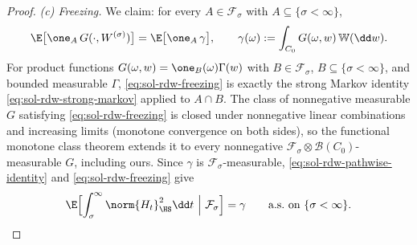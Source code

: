 \documentclass[../main.tex]{subfiles}
\begin{document}
\begin{proof}
\emph{(c) Freezing.}  We claim: for every $A\in\mathcal F_\sigma$ with
$A\subseteq\{\sigma<\infty\}$,
\begin{equation}
  \E\bigl[\one_A\,G(\cdot,W^{(\sigma)})\bigr]
  =\E\bigl[\one_A\,\gamma\bigr],
  \qquad
  \gamma(\omega):=\int_{C_0}G(\omega,w)\,\mathbb W(\dd w).
  \label{eq:sol-rdw-freezing}
\end{equation}
For product functions $G(\omega,w)=\one_B(\omega)\Gamma(w)$ with
$B\in\mathcal F_\sigma$, $B\subseteq\{\sigma<\infty\}$, and bounded measurable
$\Gamma$, \eqref{eq:sol-rdw-freezing} is exactly the strong Markov identity
\eqref{eq:sol-rdw-strong-markov} applied to $A\cap B$.  The class of nonnegative
measurable $G$ satisfying \eqref{eq:sol-rdw-freezing} is closed under nonnegative
linear combinations and increasing limits (monotone convergence on both sides), so the
functional monotone class theorem extends it to every nonnegative
$\mathcal F_\sigma\otimes\mathcal B(C_0)$-measurable $G$, including ours.  Since
$\gamma$ is $\mathcal F_\sigma$-measurable, \eqref{eq:sol-rdw-pathwise-identity} and
\eqref{eq:sol-rdw-freezing} give
\begin{equation}
  \E\Bigl[\int_\sigma^\infty\norm{H_t}_{\HS}^2\dd t\ \Big|\ \mathcal F_\sigma\Bigr]
  =\gamma
  \qquad\text{a.s.\ on }\{\sigma<\infty\}.
  \label{eq:sol-rdw-conditional-identity}
\end{equation}


\end{proof}
\end{document}
